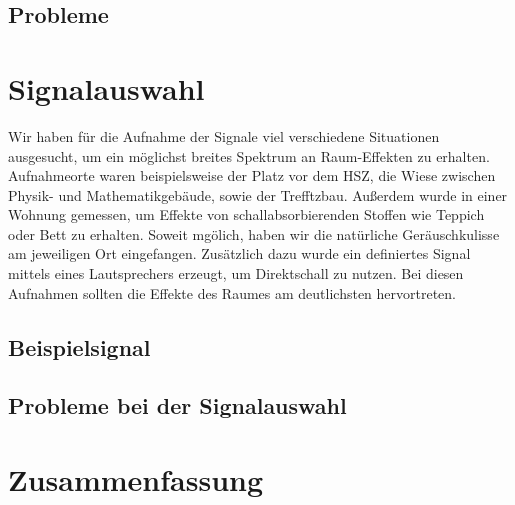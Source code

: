 \subsection{Probleme} 


\section{Signalauswahl}
Wir haben für die Aufnahme der Signale viel verschiedene Situationen ausgesucht, um ein möglichst breites Spektrum an Raum-Effekten zu erhalten. Aufnahmeorte waren beispielsweise der Platz vor dem HSZ, die Wiese zwischen Physik- und Mathematikgebäude, sowie der Trefftzbau. Außerdem wurde in einer Wohnung gemessen, um Effekte von schallabsorbierenden Stoffen wie Teppich oder Bett zu erhalten. Soweit mgölich, haben wir die natürliche Geräuschkulisse am jeweiligen Ort eingefangen. Zusätzlich dazu wurde ein definiertes Signal mittels eines Lautsprechers erzeugt, um Direktschall zu nutzen. Bei diesen Aufnahmen sollten die Effekte des Raumes am deutlichsten hervortreten.
\subsection{Beispielsignal}
\subsection{Probleme bei der Signalauswahl}

\section{Zusammenfassung}
